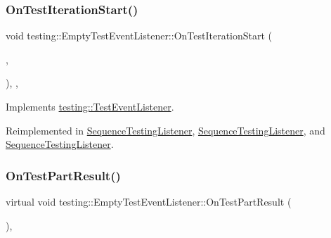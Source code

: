 \subsubsection{\texorpdfstring{OnTestIterationStart()}{OnTestIterationStart()}\hspace{0.1cm}{\footnotesize\ttfamily [3/3]}}
{\footnotesize\ttfamily void testing\+::\+Empty\+Test\+Event\+Listener\+::\+On\+Test\+Iteration\+Start (\begin{DoxyParamCaption}\item[{const \mbox{\hyperlink{classtesting_1_1_unit_test}{Unit\+Test}} \&}]{,  }\item[{int}]{ }\end{DoxyParamCaption})\hspace{0.3cm}{\ttfamily [inline]}, {\ttfamily [override]}, {\ttfamily [virtual]}}



Implements \mbox{\hyperlink{classtesting_1_1_test_event_listener_a60cc09b7907cb329d152eb5e7133bdeb}{testing\+::\+Test\+Event\+Listener}}.



Reimplemented in \mbox{\hyperlink{class_sequence_testing_listener_a345641262fa10cc4b251ac54116db74b}{Sequence\+Testing\+Listener}}, \mbox{\hyperlink{class_sequence_testing_listener_a31ffb1bb77e88fff266511b1d8427e20}{Sequence\+Testing\+Listener}}, and \mbox{\hyperlink{class_sequence_testing_listener_a31ffb1bb77e88fff266511b1d8427e20}{Sequence\+Testing\+Listener}}.

\mbox{\label{classtesting_1_1_empty_test_event_listener_a59e7f7d9f2e2d089a6e8c1e2577f4718}} 
\subsubsection{\texorpdfstring{OnTestPartResult()}{OnTestPartResult()}\hspace{0.1cm}{\footnotesize\ttfamily [1/3]}}
{\footnotesize\ttfamily virtual void testing\+::\+Empty\+Test\+Event\+Listener\+::\+On\+Test\+Part\+Result (\begin{DoxyParamCaption}\item[{const Test\+Part\+Result \&}]{ }\end{DoxyParamCaption})\hspace{0.3cm}{\ttfamily [inline]}, {\ttfamily [virtual]}}




